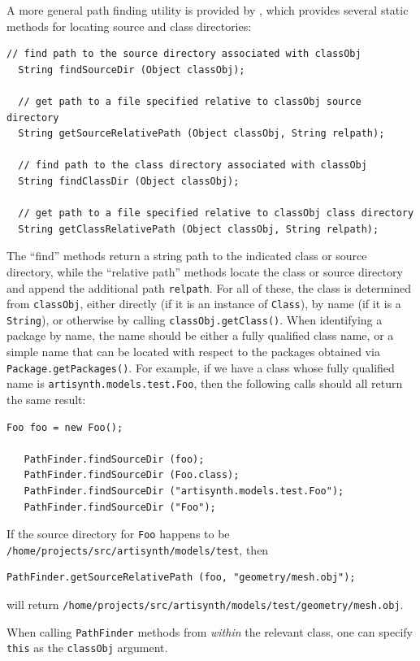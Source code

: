 A more general path finding utility is provided by
, which provides several static
methods for locating source and class directories:
%
\begin{lstlisting}[]
  // find path to the source directory associated with classObj
  String findSourceDir (Object classObj);

  // get path to a file specified relative to classObj source directory
  String getSourceRelativePath (Object classObj, String relpath);

  // find path to the class directory associated with classObj
  String findClassDir (Object classObj);

  // get path to a file specified relative to classObj class directory
  String getClassRelativePath (Object classObj, String relpath);
\end{lstlisting}
%
The ``find'' methods return a string path to the indicated class or
source directory, while the ``relative path'' methods locate the class
or source directory and append
the additional path {\tt relpath}.  For all of these, the class is
determined from {\tt classObj}, either directly (if it is an instance
of {\tt Class}), by name (if it is a {\tt String}), or otherwise by
calling {\tt classObj.getClass()}. When identifying a package by name,
the name should be either a fully qualified class name, or a simple
name that can be located with respect to the packages obtained via
{\tt Package.getPackages()}. For example, if we have a class whose
fully qualified name is {\tt artisynth.models.test.Foo}, then the
following calls should all return the same result:
%
\begin{lstlisting}[]
   Foo foo = new Foo();

   PathFinder.findSourceDir (foo);
   PathFinder.findSourceDir (Foo.class);
   PathFinder.findSourceDir ("artisynth.models.test.Foo");
   PathFinder.findSourceDir ("Foo");
\end{lstlisting}
%
If the source directory for {\tt Foo} happens to be {\tt
/home/projects/src/artisynth/models/test}, then
%
\begin{lstlisting}[]
   PathFinder.getSourceRelativePath (foo, "geometry/mesh.obj");
\end{lstlisting}
%
will return
{\tt /home/projects/src/artisynth/models/test/geometry/mesh.obj}.

\begin{sideblock}
When calling {\tt PathFinder} methods from {\it within} the relevant
class, one can specify {\tt this} as the {\tt classObj} argument.
\end{sideblock}

